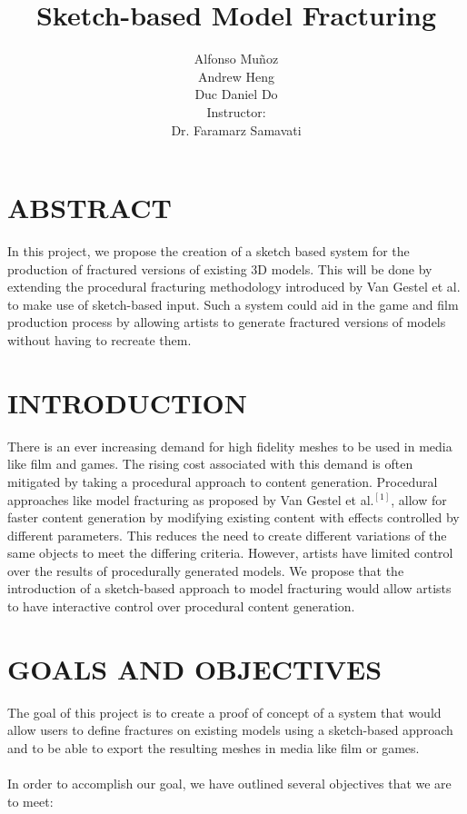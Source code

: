 \documentclass[titlepage, 11pt]{article}
\begin{document}
\title{Sketch-based Model Fracturing}
\author{
Alfonso Mu\~{n}oz\\
Andrew Heng\\
Duc Daniel Do\\
[1cm]{\small Instructor:}\\
\small{Dr. Faramarz Samavati}
}
\maketitle

\section{ABSTRACT}
In this project, we propose the creation of a sketch based system for the production of fractured versions of existing 3D models. This will be done by extending the procedural fracturing methodology introduced by Van Gestel et al. to make use of sketch-based input. Such a system could aid in the game and film production process by allowing artists to generate fractured versions of models without having to recreate them.

\section{INTRODUCTION}
There is an ever increasing demand for high fidelity meshes to be used in media like film and games. The rising cost associated with this demand is often mitigated by taking a procedural approach to content generation. Procedural approaches like model fracturing as proposed by Van Gestel et al.$^{[1]}$, allow for faster content generation by modifying existing content with effects controlled by different parameters. This reduces the need to create different variations of the same objects to meet the differing criteria. However, artists have limited control over the results of procedurally generated models. We propose that the introduction of a sketch-based approach to model fracturing would allow artists to have interactive control over procedural content generation.

\section{GOALS AND OBJECTIVES}
The goal of this project is to create a proof of concept of a system that would allow users to define fractures on existing models using a sketch-based approach and to be able to export the resulting meshes in media like film or games.\\
\\
In order to accomplish our goal, we have outlined several objectives that we are to meet:
\end{document}
